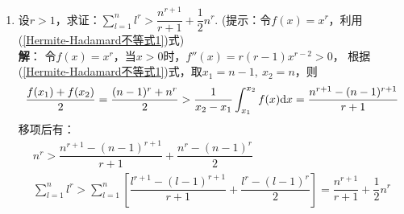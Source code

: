 \begin{enumerate}[label={\textbf{\arabic*.}},leftmargin=
    \inteval{\myenumleftmargin}pt]
(\ref{三次函数凹凸性-求导证明})式成立。\\
(4) 
\begin{align}
    p\ln x_1+q\ln x_2 &\leq \ln(px_1+qx_2) \q \Leftrightarrow \nonumber\\
    x_1^{p}x_2^q=\Big(\dfrac{x_1}{x_2}\Big)^p x_2 &\leq px_1+(1-p)x_2
    \q \Leftrightarrow \nonumber\\
    \Big(\dfrac{x_1}{x_2}\Big)^p &\leq p\Big(\dfrac{x_1}{x_2}\Big)+1-p
    \q \Leftrightarrow \nonumber\\
    \left[1+\Big(\dfrac{x_1}{x_2}-1\Big)\right]^p &\leq 
    1+p\Big(\dfrac{x_1}{x_2}-1\Big) \label{凹凸性习题-伯努利不等式}
\end{align}
由伯努利不等式，(\ref{凹凸性习题-伯努利不等式})式显然成立。
或者求导证明，不妨设$ x_1\geq x_2>0 $，\\
记$ g(x)=(1+x)^p-1-px\ (x\geq 0,\ 0<p<1) $，
则$ g'(x)=p(1+x)^{p-1}-p\leq 0 $，\\ 
$ g(x)\leq g(0)=0 $，$ (1+x)^p\leq 1+px $，
令$ x=\dfrac{x_1}{x_2}-1\geq 0 $，
即可得(\ref{凹凸性习题-伯努利不等式})式成立。\\
(5) $ p\e^{x_1}+q\e^{x_2}\geq \e^{px_1+qx_2} $，令$ \e^{x_1}=u_1>0 $，
$ \e^{x_2}=u_2>0 $，则只需证$ pu_1+qu_2\geq u_1^pu_2^q $，这就是(4)的结果。\\
(6) 
\begin{gather*}
    \dfrac{1}{4}(x_1^2+2+2\sqrt{x_1^2+2}\sqrt{x_2^2+2}+x_2^2+2)\geq 
    \dfrac{1}{4}(x_1^2+2x_1x_2+x_2^2)+2 \q \Leftrightarrow \\
    \sqrt{x_1^2+2}\sqrt{x_2^2+2}\geq x_1x_2+2 \q \text{(两边平方即可证明)}
\end{gather*}
(7) 要证$ \dfrac{1}{2}(x_1\ln x_1+x_2\ln x_2)\geq \dfrac{x_1+x_2}{2}
\ln \dfrac{x_1+x_2}{2} $，可以固定$ x_1 $，以$ x_2 $为变量，
然后对$ x_2 $求导，过程略。\\
(8)把(7)中的$ x_i $换成$ \e^{x_i} $即得。\\
请读者分别计算以上各个函数的二阶导数，并判断其正负号，再结合函数图像
体会二阶导数的正负与凹凸性的关系。

\item 设$ r>1 $，求证：$ \sum\limits_{l=1}^n l^r>\dfrac{n^{r+1}}{r+1}+\dfrac{1}{2}n^r $.
(提示：令$ f(x)=x^r $，利用(\ref{Hermite-Hadamard不等式1})式) 
\ifteach \\ \textbf{解}：
令$ f(x)=x^r $，当$ x>0 $时，$ f''(x)=r(r-1)x^{r-2}>0 $，
根据(\ref{Hermite-Hadamard不等式1})式，取$ x_1=n-1,\ x_2=n $，则
\begin{gather*}
    \dfrac{f(x_1)+f(x_2)}{2}=\dfrac{(n-1)^r+n^r}{2}>
    \dfrac{1}{x_2-x_1}\int_{x_1}^{x_2}f(x)\mathrm{d} x=\dfrac{n^{r+1}-(n-1)^{r+1}}{r+1}
\end{gather*}
移项后有：
\begin{gather*}
    n^r > \dfrac{n^{r+1}-(n-1)^{r+1}}{r+1}+\dfrac{n^{r}-(n-1)^{r}}{2} \\
    \sum\limits_{l=1}^n l^r>\sum_{l=1}^n
    \left[\dfrac{l^{r+1}-(l-1)^{r+1}}{r+1}+\dfrac{l^{r}-(l-1)^{r}}{2}\right]=
    \dfrac{n^{r+1}}{r+1}+\dfrac{1}{2}n^r
\end{gather*}
\fi


\end{enumerate}
